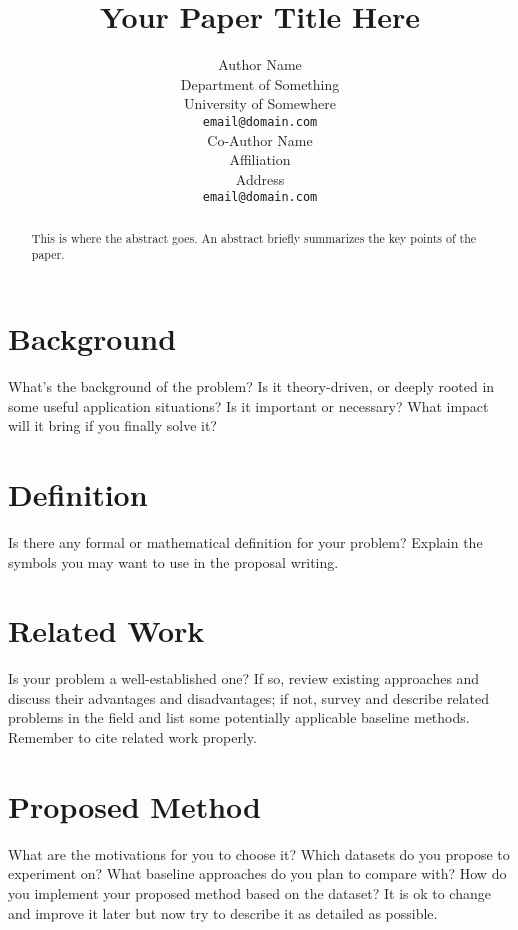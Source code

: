\documentclass{article}
\title{Your Paper Title Here}
\author{%
  Author Name\\
  Department of Something\\
  University of Somewhere\\
  \texttt{email@domain.com} \\
  \And
  Co-Author Name \\
  Affiliation \\
  Address \\
  \texttt{email@domain.com} \\
}
\begin{document}
\maketitle

\begin{abstract}
This is where the abstract goes. An abstract briefly summarizes the key points of the paper.
\end{abstract}

\section{Background}
What’s the background of the problem? Is it theory-driven, or deeply rooted in some useful application situations? Is it important or necessary? What impact will it bring if you finally solve it?

\section{Definition}
Is there any formal or mathematical definition for your problem? Explain the symbols you may want to use in the proposal writing.

\section{Related Work}
Is your problem a well-established one? If so, review existing approaches and discuss their advantages and disadvantages; if not, survey and describe related problems in the field and list some potentially applicable baseline methods. Remember to cite related work properly.

\section{Proposed Method}
What are the motivations for you to choose it? Which datasets do you propose to experiment on? What baseline approaches do you plan to compare with? How do you implement your proposed method based on the dataset? It is ok to change and improve it later but now try to describe it as detailed as possible.

% 
% 
\end{document}
